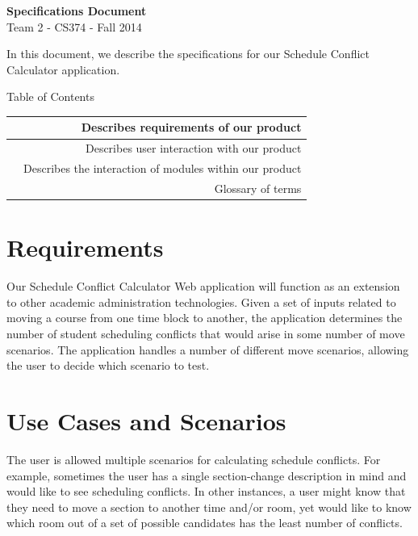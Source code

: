 \documentclass[11pt]{article}
\begin{document}
\begin{center}
\LARGE{\textbf{Specifications Document}}\\
\normalsize{Team 2 - CS374 - Fall 2014}
\end{center}
\vspace{.1in}

In this document, we describe the specifications for our Schedule Conflict Calculator application.
\vspace{.2in}

\LARGE Table of Contents \\

\normalsize
\begin{tabular}{| l || r |}
  \hline
  \nameref{sec:reqs} & Describes requirements of our product \\ \hline
  \nameref{sec:scenes} & Describes user interaction with our product \\ \hline
  \nameref{sec:dataflow} & Describes the interaction of modules within our product \\ \hline
  \nameref{sec:glossary} & Glossary of terms \\
  \hline
\end{tabular}

\pagebreak[4]

\section{Requirements} \label{sec:reqs}

Our Schedule Conflict Calculator Web application will function as an extension to other academic administration technologies. Given
a set of inputs related to moving a course from one time block to another, the application determines the number of student
scheduling conflicts that would arise in some number of move scenarios. The application handles a number of different move
scenarios, allowing the user to decide which scenario to test.

\pagebreak[4]

\section{Use Cases and Scenarios} \label{sec:scenes}

The user is allowed multiple scenarios for calculating schedule conflicts. For example, sometimes the user has a single section-change
description in mind and would like to see scheduling conflicts. In other instances, a user might know that they need to move a section
to another time and/or room, yet would like to know which room out of a set of possible candidates has the least number of conflicts.
\vspace{.2in}
\end{document}
